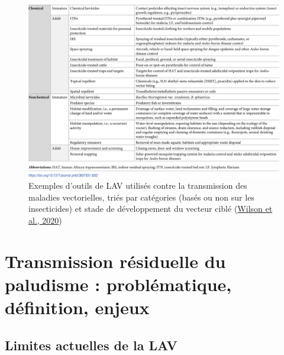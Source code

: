 \documentclass[12pt,twoside]{reedthesis}
\begin{document}
\begin{figure}

{\centering \includegraphics[width=1\linewidth]{figure/vc_tools} 

}

\caption[Exemples d'outils de lutte anti-vectorielle]{Exemples d'outils de LAV utilisés contre la transmission des maladies vectorielles, triés par catégories (basés ou non sur les insecticides) et stade de développement du vecteur ciblé (\protect\hyperlink{ref-wilson_importance_2020}{Wilson et al., 2020})}\label{fig:vc-tools}
\end{figure}
\hypertarget{transmission-ruxe9siduelle-du-paludisme-probluxe9matique-duxe9finition-enjeux}{%
\section{Transmission résiduelle du paludisme : problématique, définition, enjeux}\label{transmission-ruxe9siduelle-du-paludisme-probluxe9matique-duxe9finition-enjeux}}

\hypertarget{limites-actuelles-de-la-lav}{%
\subsection{Limites actuelles de la LAV}\label{limites-actuelles-de-la-lav}}
\end{document}

